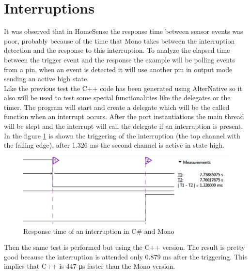 \section{Interruptions}\label{S:Performance-Interruptions}
It was observed that in HomeSense the response time between sensor events was poor, probably because of the time that Mono takes between the interruption detection and the response to this interruption. To analyze the elapsed time between the trigger event and the response the example will be polling events from a pin, when an event is detected it will use another pin in output mode sending an active high state.
\\
Like the previous test the C++ code has been generated using AlterNative so it also will be used to test some special functionalities like the delegates or the timer. The program will start and create a delegate which will be the called function when an interrupt occurs. After the port instantiations the main thread will be slept and the interrupt will call the delegate if an interruption is present.
\\
In the figure \ref{fig:interrupt-csharp} is shown the triggering of the interruption (the top channel with the falling edge), after 1.326 ms the second channel is active in state high.
\begin{figure}[H]\begin{center}
 \centering
  \captionsetup{justification=centering}
  \includegraphics[scale=0.65]{pictures/performance-tests/Interruptions/csharp}
  \caption{Response time of an interruption in C\# and Mono\label{fig:interrupt-csharp}}
\end{center}\end{figure}
Then the same test is performed but using the C++ version. The result is pretty good because the interruption is attended only 0.879 ms after the triggering. This implies that C++ is 447 μs faster than the Mono version.
